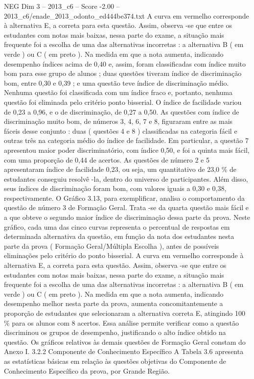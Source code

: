 \begin{textsample}{NEG Dim 3 – 2013\_c6 – Score -2.00 – 2013\_c6/enade\_2013\_odonto\_ed444be374.txt}
A curva em vermelho corresponde à alternativa E, a correta para esta questão.
Assim, observa -se que entre os estudantes com notas mais baixas, nessa parte do exame, a situação mais frequente foi a escolha de uma das alternativas incorretas : a alternativa B ( em verde ) ou C ( em preto ).
Na medida em que a nota aumenta, indicando desempenho índices acima de 0,40 e, assim, foram classificadas com índice muito bom para esse grupo de alunos ; duas questões tiveram índice de discriminação bom, entre 0,30 e 0,39 ; e uma questão teve índice de discriminação médio.
Nenhuma questão foi classificada com um índice fraco e, portanto, nenhuma questão foi eliminada pelo critério ponto bisserial.
O índice de facilidade variou de 0,23 a 0,96, e o de discriminação, de 0,27 a 0,50.
As questões com índice de discriminação muito bom, de números 3, 4, 6, 7 e 8, figuraram entre as mais fáceis desse conjunto : duas ( questões 4 e 8 ) classificadas na categoria fácil e outras três na categoria médio do índice de facilidade.
Em particular, a questão 7 apresentou maior poder discriminatório, com índice 0,50, e foi a quinta mais fácil, com uma proporção de 0,44 de acertos.
As questões de número 2 e 5 apresentaram índice de facilidade 0,23, ou seja, um quantitativo de 23,0 \% de estudantes conseguiu resolvê -la, dentro do universo de participantes.
Além disso, seus índices de discriminação foram bom, com valores iguais a 0,30 e 0,38, respectivamente.
O Gráfico 3.13, para exemplificar, analisa o comportamento da questão de número 3 de Formação Geral.
Trata -se da quarta questão mais fácil e a que obteve o segundo maior índice de discriminação dessa parte da prova.
Neste gráfico, cada uma das cinco curvas representa o percentual de respostas em determinada alternativa da questão, em função da nota dos estudantes nesta parte da prova ( Formação Geral/Múltipla Escolha ), antes de possíveis eliminações pelo critério do ponto bisserial.
A curva em vermelho corresponde à alternativa E, a correta para esta questão.
Assim, observa -se que entre os estudantes com notas mais baixas, nessa parte do exame, a situação mais frequente foi a escolha de uma das alternativas incorretas : a alternativa B ( em verde ) ou C ( em preto ).
Na medida em que a nota aumenta, indicando desempenho melhor nesta parte da prova, aumenta concomitantemente a proporção de estudantes que selecionaram a alternativa correta E, atingindo 100 \% para os alunos com 8 acertos.
Essa análise permite verificar como a questão discriminou os grupos de desempenho, justificando o alto índice obtido na questão.
Os gráficos relativos às demais questões de Formação Geral constam do Anexo I. 3.2.2 Componente de Conhecimento Específico A Tabela 3.6 apresenta as estatísticas básicas em relação às questões objetivas do Componente de Conhecimento Específico da prova, por Grande Região.

\end{textsample}
